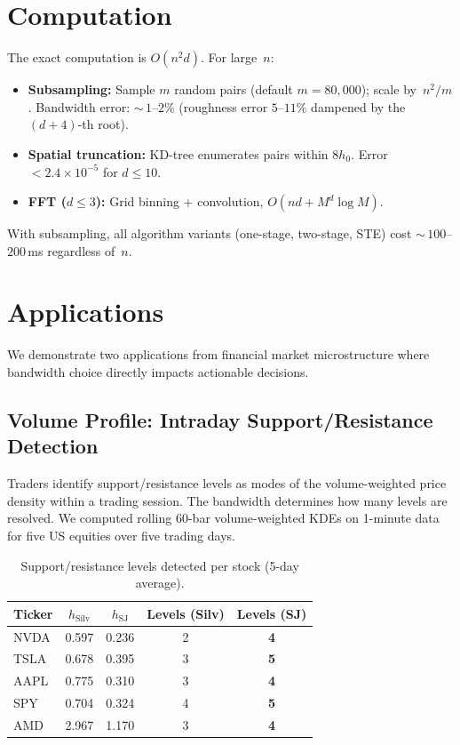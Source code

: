\documentclass[12pt]{article}
\begin{document}
\section{Computation}
\label{sec:computation}

The exact computation is $O(n^2 d)$. For large~$n$:
\begin{itemize}
  \item \textbf{Subsampling:} Sample $m$ random pairs (default $m{=}80{,}000$); scale by~$n^2/m$. Bandwidth error: ${\sim}\,1$--$2\%$ (roughness error $5$--$11\%$ dampened by the $(d{+}4)$-th root).
  \item \textbf{Spatial truncation:} KD-tree enumerates pairs within $8h_0$. Error $<2.4\times10^{-5}$ for $d\leq 10$.
  \item \textbf{FFT ($d\leq 3$):} Grid binning + convolution, $O(nd + M^d\log M)$.
\end{itemize}
With subsampling, all algorithm variants (one-stage, two-stage, STE) cost ${\sim}\,100$--$200\,$ms regardless of~$n$.

\section{Applications}
\label{sec:applications}

We demonstrate two applications from financial market microstructure where bandwidth choice directly impacts actionable decisions.

\subsection{Volume Profile: Intraday Support/Resistance Detection}

Traders identify support/resistance levels as modes of the volume-weighted price density within a trading session. The bandwidth determines how many levels are resolved. We computed rolling 60-bar volume-weighted KDEs on 1-minute data for five US equities over five trading days.

\begin{table}[t]
\centering
\caption{Support/resistance levels detected per stock (5-day average).}
\label{tab:volume}
\begin{tabular}{lcccc}
\toprule
Ticker & $h_{\text{Silv}}$ & $h_{\text{SJ}}$ & Levels (Silv) & Levels (SJ) \\
\midrule
NVDA & 0.597 & 0.236 & 2 & \textbf{4} \\
TSLA & 0.678 & 0.395 & 3 & \textbf{5} \\
AAPL & 0.775 & 0.310 & 3 & \textbf{4} \\
SPY  & 0.704 & 0.324 & 4 & \textbf{5} \\
AMD  & 2.967 & 1.170 & 3 & \textbf{4} \\
\bottomrule
\end{tabular}
\end{table}
\end{document}
